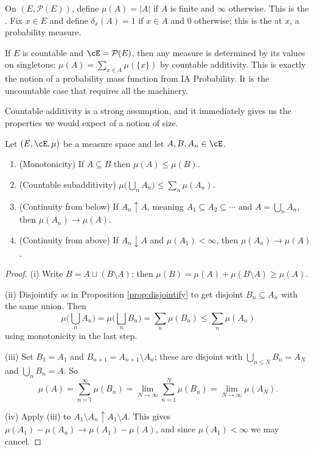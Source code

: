 \begin{example}
	On $(E, \mathcal{P}(E))$, define $\mu(A) = |A|$ if $A$ is finite and $\infty$ otherwise. This is the . Fix $x \in E$ and define $\delta_x(A) = 1$ if $x \in A$ and $0$ otherwise; this is the  at $x$, a probability measure.
\end{example}

\begin{remark}
	If $E$ is countable and $\cE = \mathcal{P}(E)$, then any measure is determined by its values on singletons: $\mu(A) = \sum_{x \in A} \mu(\{x\})$ by countable additivity. This is exactly the notion of a probability mass function from IA Probability. It is the uncountable case that requires all the machinery.
\end{remark}

Countable additivity is a strong assumption, and it immediately gives us the properties we would expect of a notion of size.

\begin{proposition}\label{prop:measure-basic}
	Let $(E, \cE, \mu)$ be a measure space and let $A, B, A_n \in \cE$.
	\begin{enumerate}[label=(\roman*)]
		\item (Monotonicity) If $A \subseteq B$ then $\mu(A) \leq \mu(B)$.
		\item (Countable subadditivity) $\mu\big( \bigcup_n A_n \big) \leq \sum_n \mu(A_n)$.
		\item (Continuity from below) If $A_n \uparrow A$, meaning $A_1 \subseteq A_2 \subseteq \cdots$ and $A = \bigcup_n A_n$, then $\mu(A_n) \to \mu(A)$.
		\item (Continuity from above) If $A_n \downarrow A$ and $\mu(A_1) < \infty$, then $\mu(A_n) \to \mu(A)$.
	\end{enumerate}
\end{proposition}
\begin{proof}
	(i) Write $B = A \sqcup (B \setminus A)$; then $\mu(B) = \mu(A) + \mu(B\setminus A) \geq \mu(A)$.

	(ii) Disjointify as in Proposition \ref{prop:disjointify} to get disjoint $B_n \subseteq A_n$ with the same union. Then
	$$
	\mu\Big( \bigcup_n A_n \Big) = \mu\Big( \bigsqcup_n B_n \Big) = \sum_n \mu(B_n) \leq \sum_n \mu(A_n)
	$$
	using monotonicity in the last step.

	(iii) Set $B_1 = A_1$ and $B_{n+1} = A_{n+1} \setminus A_n$; these are disjoint with $\bigcup_{n \leq N} B_n = A_N$ and $\bigcup_n B_n = A$. So
	$$
	\mu(A) = \sum_{n=1}^\infty \mu(B_n) = \lim_{N \to \infty} \sum_{n=1}^N \mu(B_n) = \lim_{N\to\infty} \mu(A_N).
	$$

	(iv) Apply (iii) to $A_1 \setminus A_n \uparrow A_1 \setminus A$. This gives $\mu(A_1) - \mu(A_n) \to \mu(A_1) - \mu(A)$, and since $\mu(A_1) < \infty$ we may cancel.
\end{proof}


